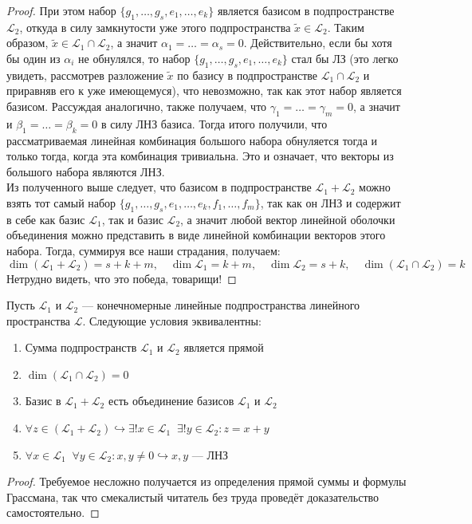 \documentclass[11pt]{article}
\begin{document}
\begin{proof}
    При этом набор $\{g_1, \ldots, g_s, e_1, \ldots, e_k\}$ является базисом в подпространстве $\mathcal{L}_2$, откуда в силу замкнутости уже этого подпространства $\widetilde{x} \in \mathcal{L}_2$.
    Таким образом, $\widetilde{x} \in \mathcal{L}_1 \cap \mathcal{L}_2$, а значит $\alpha_1 = \ldots = \alpha_s = 0$. Действительно, если бы хотя бы один из $\alpha_i$ не обнулялся, то набор $\{g_1, \ldots, g_s, e_1, \ldots, e_k\}$ стал бы ЛЗ (это легко увидеть, рассмотрев разложение $\widetilde{x}$ по базису в подпространстве $\mathcal{L}_1 \cap \mathcal{L}_2$ и приравняв его к уже имеющемуся), что невозможно, так как этот набор является базисом. Рассуждая аналогично, также получаем, 
    что $\gamma_1 = \ldots = \gamma_m = 0$, а значит и $\beta_1 = \ldots = \beta_k = 0$ в силу ЛНЗ базиса. Тогда итого получили, что рассматриваемая линейная комбинация большого набора обнуляется тогда и только тогда, когда эта комбинация тривиальна. Это и означает, что векторы из большого набора являются ЛНЗ.
    \\
    Из полученного выше следует, что базисом в подпространстве $\mathcal{L}_1 + \mathcal{L}_2$ можно взять тот самый набор $\{g_1, \ldots, g_s, e_1, \ldots, e_k, f_1, \ldots, f_m\}$, так как он ЛНЗ и содержит в себе как базис $\mathcal{L}_1$, так и базис $\mathcal{L}_2$, а 
    значит любой вектор линейной оболочки объединения можно представить в виде линейной комбинации векторов этого набора. Тогда, суммируя все наши страдания, получаем:
    \[\dim \left(\mathcal{L}_1 + \mathcal{L}_2\right) = s + k + m, \quad \dim \mathcal{L}_1 = k + m, \quad \dim \mathcal{L}_2 = s + k, \quad \dim \left(\mathcal{L}_1 \cap \mathcal{L}_2\right) = k\]
    Нетрудно видеть, что это победа, товарищи!
\end{proof}


\begin{lemma}
    Пусть $\mathcal{L}_1$ и $\mathcal{L}_2$ --- конечномерные линейные подпространства линейного пространства $\mathcal{L}$. Следующие условия эквивалентны:
    \begin{enumerate}
        \item Сумма подпространств $\mathcal{L}_1$ и $\mathcal{L}_2$ является прямой
        \item $\dim\left(\mathcal{L}_1 \cap \mathcal{L}_2\right) = 0$
        \item Базис в $\mathcal{L}_1 + \mathcal{L}_2$ есть объединение базисов $\mathcal{L}_1$ и $\mathcal{L}_2$
        \item $\forall z \in \left(\mathcal{L}_1 + \mathcal{L}_2\right) \hookrightarrow \exists ! x \in \mathcal{L}_1 \; \; \exists ! y \in \mathcal{L}_2: z = x + y$
        \item $\forall x \in \mathcal{L}_1 \; \; \forall y \in \mathcal{L}_2: x, y \neq 0 \hookrightarrow x, y \text{ --- ЛНЗ}$
    \end{enumerate}
\end{lemma}

\begin{proof}
    Требуемое несложно получается из определения прямой суммы и формулы Грассмана, так что смекалистый читатель без труда проведёт доказательство самостоятельно.
\end{proof}
\end{document}
